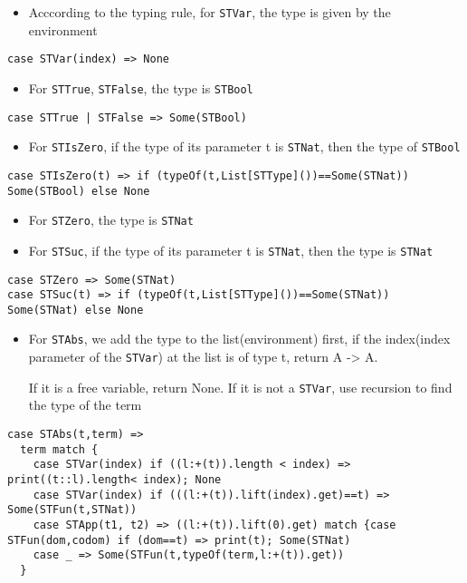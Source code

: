 \documentclass[11pt]{article}
\begin{document}
\begin{itemize}
\item Acccording to the typing rule, for \texttt{STVar}, the type is given by the environment
\end{itemize}
\begin{verbatim}
case STVar(index) => None                                                                                                                                                                                                                                             
\end{verbatim}

\begin{itemize}
\item For \texttt{STTrue}, \texttt{STFalse}, the type is \texttt{STBool}
\end{itemize}
\begin{verbatim}
case STTrue | STFalse => Some(STBool)
\end{verbatim}

\begin{itemize}
\item For \texttt{STIsZero}, if the type of its parameter t is \texttt{STNat}, then the type of \texttt{STBool}
\end{itemize}
\begin{verbatim}
case STIsZero(t) => if (typeOf(t,List[STType]())==Some(STNat)) Some(STBool) else None
\end{verbatim}

\begin{itemize}
\item For \texttt{STZero}, the type is \texttt{STNat}
\item For \texttt{STSuc}, if the type of its parameter t is \texttt{STNat}, then the type is \texttt{STNat}
\end{itemize}
\begin{verbatim}
case STZero => Some(STNat)
case STSuc(t) => if (typeOf(t,List[STType]())==Some(STNat)) Some(STNat) else None
\end{verbatim}

\begin{itemize}
\item For \texttt{STAbs}, we add the type to the list(environment) first, if the index(index parameter of the \texttt{STVar}) at the list is of type t, return A -> A.

If it is a free variable, return None. If it is not a \texttt{STVar}, use recursion to find the type of the term
\end{itemize}
\begin{verbatim}
case STAbs(t,term) => 
  term match {    
    case STVar(index) if ((l:+(t)).length < index) => print((t::l).length< index); None
    case STVar(index) if (((l:+(t)).lift(index).get)==t) => Some(STFun(t,STNat))
    case STApp(t1, t2) => ((l:+(t)).lift(0).get) match {case STFun(dom,codom) if (dom==t) => print(t); Some(STNat)
    case _ => Some(STFun(t,typeOf(term,l:+(t)).get))
  }
\end{verbatim}
\end{document}
